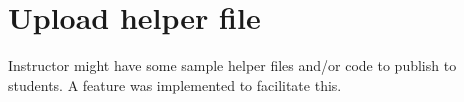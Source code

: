 \section{Upload helper file}
Instructor might have some sample helper files and/or code to publish to students. A feature was implemented to facilitate this.
